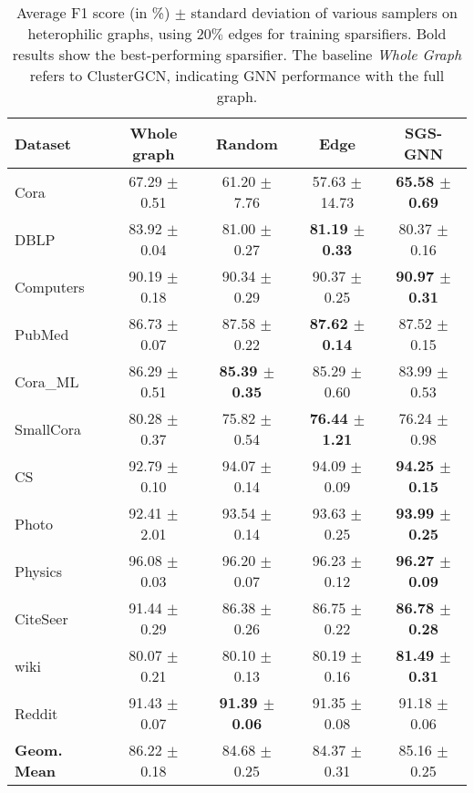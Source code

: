 
\begin{table}[!htbp]
\centering
\resizebox{1.0\linewidth}{!}
{
\def\arraystretch{1.0}
\begin{tabular}{@{}l|c|ccc@{}}
\toprule
\textbf{Dataset} & \textbf{Whole graph}  & \textbf{Random}         & \textbf{Edge}           & \textbf{SGS-GNN}        \\\midrule
Cora             & 67.29 $\pm$ 0.51 & 61.20 $\pm$ 7.76          & 57.63 $\pm$ 14.73         & \textbf{65.58 $\pm$ 0.69} \\
DBLP             & 83.92 $\pm$ 0.04 & 81.00 $\pm$ 0.27          & \textbf{81.19 $\pm$ 0.33} & 80.37 $\pm$ 0.16          \\
Computers        & 90.19 $\pm$ 0.18 & 90.34 $\pm$ 0.29          & 90.37 $\pm$ 0.25          & \textbf{90.97 $\pm$ 0.31} \\
PubMed           & 86.73 $\pm$ 0.07 & 87.58 $\pm$ 0.22          & \textbf{87.62 $\pm$ 0.14} & 87.52 $\pm$ 0.15          \\
Cora\_ML         & 86.29 $\pm$ 0.51 & \textbf{85.39 $\pm$ 0.35} & 85.29 $\pm$ 0.60          & 83.99 $\pm$ 0.53          \\
SmallCora        & 80.28 $\pm$ 0.37 & 75.82 $\pm$ 0.54          & \textbf{76.44 $\pm$ 1.21} & 76.24 $\pm$ 0.98          \\
CS               & 92.79 $\pm$ 0.10 & 94.07 $\pm$ 0.14          & 94.09 $\pm$ 0.09          & \textbf{94.25 $\pm$ 0.15} \\
Photo            & 92.41 $\pm$ 2.01 & 93.54 $\pm$ 0.14          & 93.63 $\pm$ 0.25          & \textbf{93.99 $\pm$ 0.25} \\
Physics          & 96.08 $\pm$ 0.03 & 96.20 $\pm$ 0.07          & 96.23 $\pm$ 0.12          & \textbf{96.27 $\pm$ 0.09} \\
CiteSeer         & 91.44 $\pm$ 0.29 & 86.38 $\pm$ 0.26          & 86.75 $\pm$ 0.22          & \textbf{86.78 $\pm$ 0.28} \\
wiki             & 80.07 $\pm$ 0.21 & 80.10 $\pm$ 0.13          & 80.19 $\pm$ 0.16          & \textbf{81.49 $\pm$ 0.31} \\
Reddit           & 91.43 $\pm$ 0.07 & \textbf{91.39 $\pm$ 0.06} & 91.35 $\pm$ 0.08          & 91.18 $\pm$ 0.06          \\\bottomrule
\textbf{Geom. Mean}	 & 86.22 $\pm$ 0.18	 & 84.68 $\pm$ 0.25 &	84.37 $\pm$ 0.31 &	85.16 $\pm$ 0.25
\end{tabular}
}
\caption{Average F1 score (in \%) $\pm$ standard deviation of various samplers on heterophilic graphs, using $20\%$ edges for training sparsifiers. Bold results show the best-performing sparsifier. The baseline \textit{Whole Graph} refers to ClusterGCN, indicating GNN performance with the full graph.}
\label{tab:homophilic_graphs}
\end{table}